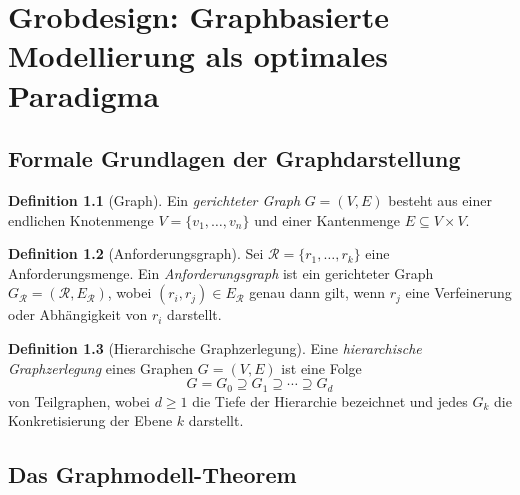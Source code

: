 ﻿\documentclass[a4paper,12pt]{report}
\theoremstyle{definition}
\newtheorem{definition}{Definition}[section]
\begin{document}
\chapter{Grobdesign: Graphbasierte Modellierung als optimales Paradigma}
\label{ch:grobdesign}
\label{sec:graphmodell}

\section{Formale Grundlagen der Graphdarstellung}

\begin{definition}[Graph]
Ein \emph{gerichteter Graph} $G = (V, E)$ besteht aus einer endlichen Knotenmenge
$V = \{v_1, \ldots, v_n\}$ und einer Kantenmenge
$E \subseteq V \times V$.
\end{definition}

\begin{definition}[Anforderungsgraph]
\label{def:anfgraph}
Sei $\mathcal{R} = \{r_1, \ldots, r_k\}$ eine Anforderungsmenge. Ein
\emph{Anforderungsgraph} ist ein gerichteter Graph
$G_{\mathcal{R}} = (\mathcal{R}, E_{\mathcal{R}})$, wobei
$(r_i, r_j) \in E_{\mathcal{R}}$ genau dann gilt, wenn $r_j$ eine Verfeinerung oder
Abhängigkeit von $r_i$ darstellt.
\end{definition}

\begin{definition}[Hierarchische Graphzerlegung]
\label{def:hierarchie}
Eine \emph{hierarchische Graphzerlegung} eines Graphen $G = (V, E)$ ist eine Folge
\[
  G = G_0 \supseteq G_1 \supseteq \cdots \supseteq G_d
\]
von Teilgraphen, wobei $d \geq 1$ die Tiefe der Hierarchie bezeichnet und jedes
$G_k$ die Konkretisierung der Ebene $k$ darstellt.
\end{definition}

\section{Das Graphmodell-Theorem}
\end{document}
